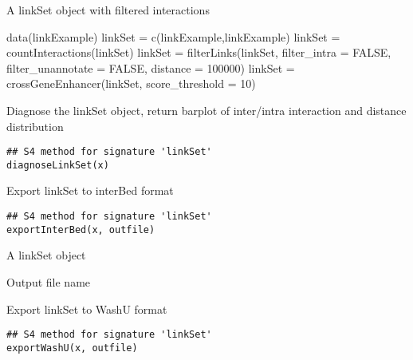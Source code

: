\documentclass[letterpaper]{book}
\begin{document}
%
\begin{Value}
A linkSet object with filtered interactions
\end{Value}
%
\begin{Examples}
\begin{ExampleCode}
data(linkExample)
linkSet = c(linkExample,linkExample)
linkSet = countInteractions(linkSet)
linkSet = filterLinks(linkSet, filter_intra = FALSE, filter_unannotate = FALSE, distance = 100000)
linkSet = crossGeneEnhancer(linkSet, score_threshold = 10)
\end{ExampleCode}
\end{Examples}
%
\begin{Description}
Diagnose the linkSet object, return barplot of inter/intra interaction and distance distribution
\end{Description}
%
\begin{Usage}
\begin{verbatim}
## S4 method for signature 'linkSet'
diagnoseLinkSet(x)
\end{verbatim}
\end{Usage}
%
\begin{Description}
Export linkSet to interBed format
\end{Description}
%
\begin{Usage}
\begin{verbatim}
## S4 method for signature 'linkSet'
exportInterBed(x, outfile)
\end{verbatim}
\end{Usage}
%
\begin{Arguments}
\begin{ldescription}
\item[\code{x}] A linkSet object

\item[\code{outfile}] Output file name
\end{ldescription}
\end{Arguments}
%
\begin{Description}
Export linkSet to WashU format
\end{Description}
%
\begin{Usage}
\begin{verbatim}
## S4 method for signature 'linkSet'
exportWashU(x, outfile)
\end{verbatim}
\end{Usage}
\end{document}
